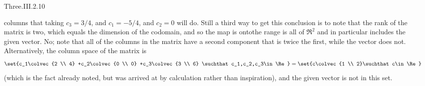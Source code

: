 \begin{ans}{Three.III.2.10}
\begin{exparts}
         columns that taking $c_3=3/4$, and $c_1=-5/4$, and $c_2=0$ will do.
         Still a third way to get this conclusion is to note that the rank
         of the matrix is two, which equals the dimension of the
         codomain, and so the map is onto\Dash the range is all of $\Re^2$ and
         in particular includes the given vector.
       \partsitem No; note that all of the columns in the matrix have a second
         component that is twice the first, while the vector does not.
         Alternatively, the column space of the matrix is
         \begin{equation*}
           \set{c_1\colvec{2 \\ 4}
                +c_2\colvec{0 \\ 0}
                +c_3\colvec{3 \\ 6} \suchthat c_1,c_2,c_3\in\Re}
           =\set{c\colvec{1 \\ 2}\suchthat c\in\Re}
         \end{equation*}
         (which is the fact already noted, but was arrived at by calculation
         rather than inspiration), and the given vector is not in this set.
     \end{exparts}
    
\end{ans}
